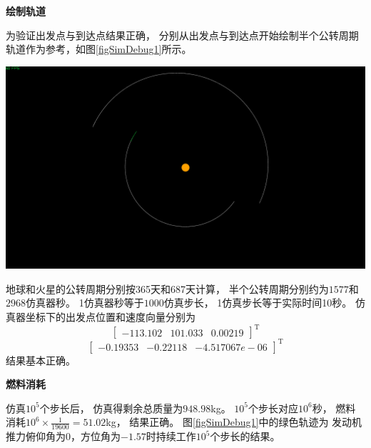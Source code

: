 \noindent\textbf{绘制轨道}\par
为验证出发点与到达点结果正确，
分别从出发点与到达点开始绘制半个公转周期轨道作为参考，如图\ref{figSimDebug1}所示。
\begin{center}
	\includegraphics[scale=0.2]{simdebug1.png}  \\
	\label{figSimDebug1}
\end{center}
地球和火星的公转周期分别按365天和687天计算，
半个公转周期分别约为$1577$和$2968$仿真器秒。
1仿真器秒等于$1000$仿真步长，
1仿真步长等于实际时间10秒。
仿真器坐标下的出发点位置和速度向量分别为
\[[\begin{matrix}
    -113.102 & 101.033 & 0.00219
\end{matrix}]^\text{T}\]
\[[\begin{matrix}
    -0.19353 & -0.22118 & -4.517067e-06
\end{matrix}]^\text{T}\]
结果基本正确。

\noindent\textbf{燃料消耗}\par
仿真$10^5$个步长后，
仿真得剩余总质量为$948.98$kg。
$10^5$个步长对应$10^6$秒，
燃料消耗$10^6\times\frac{1}{19600}=51.02$kg，
结果正确。
图\ref{figSimDebug1}中的绿色轨迹为
发动机推力俯仰角为0，方位角为$-1.57$时持续工作$10^5$个步长的结果。

